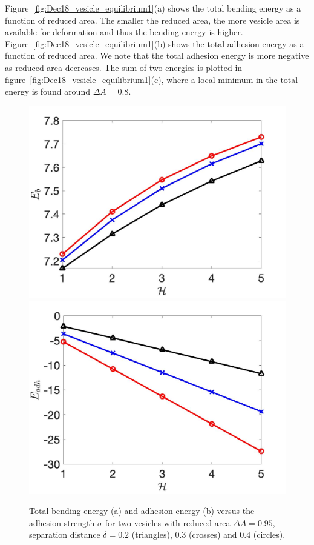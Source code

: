 \documentclass[%
preprint,
 amsmath,amssymb,
 aps,
]{revtex4-1}
\begin{document}
Figure~\ref{fig:Dec18_vesicle_equilibrium1}(a) shows the total bending energy as a function of reduced area. The smaller the reduced area, the more vesicle area is available
for deformation and thus the bending energy is higher. Figure~\ref{fig:Dec18_vesicle_equilibrium1}(b) shows the total adhesion energy as a function of reduced area. We note
that the total adhesion energy is more negative as reduced area decreases. The sum of two energies is plotted in figure~\ref{fig:Dec18_vesicle_equilibrium1}(c), where a local minimum in the total energy is
found around $\Delta A =0.8$.

\begin{figure}
\includegraphics[keepaspectratio=true,scale=0.18]{figs/Dec18_Eb_vs_sigma_rA0p9502.jpeg}
\includegraphics[keepaspectratio=true,scale=0.18]{figs/Dec18_Eadh_vs_sigma_rA0p9502.jpeg}
\caption{Total bending energy (a) and adhesion energy (b) versus the adhesion strength $\sigma$ 
for two vesicles with reduced area $\Delta A=0.95$, separation distance $\delta = 0.2$ (triangles), $0.3$ (crosses)
and $0.4$ (circles). }
\label{fig:Dec18_equilibrium} 
\end{figure}
\end{document}
